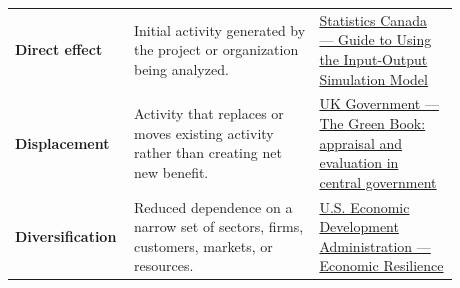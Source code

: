 \documentclass[11pt,letterpaper,oneside,openany]{book}
\begin{document}
\begin{center}
\begin{longtable}{>{\RaggedRight\arraybackslash}p{0.180\linewidth}>{\RaggedRight\arraybackslash}p{0.400\linewidth}>{\RaggedRight\arraybackslash}p{0.300\linewidth}}
\textbf{Direct effect} & Initial activity generated by the project or organization being analyzed. & \href{https://www.statcan.gc.ca/en/statistical-programs/document/5115\_D6\_T9\_V1}{Statistics Canada --- Guide to Using the Input-Output Simulation Model} \\
\textbf{Displacement} & Activity that replaces or moves existing activity rather than creating net new benefit. & \href{https://www.gov.uk/government/publications/the-green-book-appraisal-and-evaluation-in-central-government/the-green-book-2026}{UK Government --- The Green Book: appraisal and evaluation in central government} \\
\textbf{Diversification} & Reduced dependence on a narrow set of sectors, firms, customers, markets, or resources. & \href{https://www.eda.gov/resources/comprehensive-economic-development-strategy/content/economic-resilience}{U.S. Economic Development Administration --- Economic Resilience} \\
\end{longtable}
\end{center}
\end{document}
